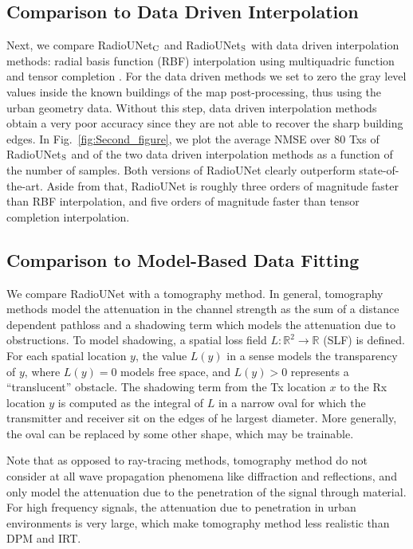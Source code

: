 \documentclass[10pt,a4paper]{article}
\begin{document}
\subsection{Comparison to Data Driven Interpolation}

Next, we compare RadioUNet$_{\rm C}$ and RadioUNet$_{\rm S}$ with data driven interpolation methods: radial basis function (RBF) interpolation using multiquadric function \cite[Sect 5.1]{BishopNNPR} and tensor completion \cite{TensorCompletion}. For the data driven methods we set to zero the gray level values inside the known buildings of the map post-processing, thus using the urban geometry data. Without this step, data driven interpolation methods obtain a very poor accuracy since they are not able to recover the sharp building edges.
 In Fig.~\ref{fig:Second_figure}, we plot the average NMSE over 80 Txs of RadioUNet$_{\rm S}$ and of the two data driven interpolation methods as a function of the number of samples. Both versions of RadioUNet clearly outperform state-of-the-art. Aside from that, RadioUNet is roughly three orders of magnitude faster than RBF interpolation, and five orders of magnitude faster than tensor completion interpolation.


\subsection{Comparison to Model-Based Data Fitting}

We compare RadioUNet with a tomography method.
In general, tomography methods model the attenuation in the channel strength as the sum of a distance dependent pathloss and a shadowing term which models the attenuation due to obstructions. To model shadowing, a spatial loss field $L:\mathbb{R}^2\rightarrow \mathbb{R}$ (SLF) is defined. For each spatial location $y$, the value $L(y)$ in a sense models the transparency of $y$, where $L(y)=0$ models free space, and $L(y)>0$ represents a ``translucent'' obstacle. The shadowing term from the Tx location $x$ to the Rx location $y$ is computed as the integral of $L$ in a narrow oval for which the transmitter and receiver sit on the edges of he largest diameter. More generally, the oval can be replaced by some other shape, which may be trainable.

Note that as opposed to ray-tracing methods, tomography method do not consider at all wave propagation phenomena like diffraction and reflections, and only model the attenuation due to the penetration of the signal through material. For high frequency signals, the attenuation due to penetration in urban environments is very large, which make tomography method less realistic than DPM and IRT.
\end{document}
